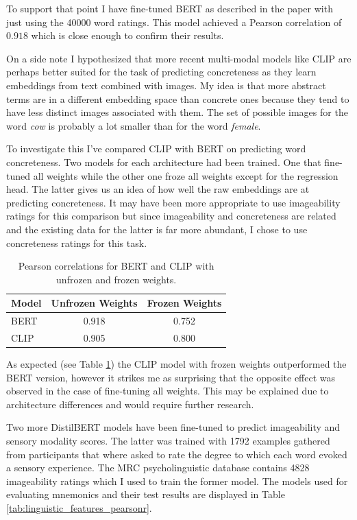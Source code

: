 To support that point I have fine-tuned BERT as described in the paper with just using the 40000 word ratings. This model achieved a Pearson correlation of $0.918$ which is close enough to confirm their results.

On a side note I hypothesized that more recent multi-modal models like CLIP are perhaps better suited for the task of predicting concreteness as they learn embeddings from text combined with images. My idea is that more abstract terms are in a different embedding space than concrete ones because they tend to have less distinct images associated with them. The set of possible images for the word \emph{cow} is probably a lot smaller than for the word \emph{female}.

To investigate this I've compared CLIP with BERT on predicting word concreteness. Two models for each architecture had been trained. One that fine-tuned all weights while the other one froze all weights except for the regression head. The latter gives us an idea of how well the raw embeddings are at predicting concreteness. It may have been more appropriate to use imageability ratings for this comparison but since imageability and concreteness are related and the existing data for the latter is far more abundant, I chose to use concreteness ratings for this task. 

\begin{table}[ht]
\centering
\begin{tabular}{@{}lcc@{}}
\toprule
Model & Unfrozen Weights & Frozen Weights \\ \midrule
BERT           & 0.918                     & 0.752                   \\
CLIP           & 0.905                     & 0.800                   \\ \bottomrule
\end{tabular}
\caption{Pearson correlations for BERT and CLIP with unfrozen and frozen weights.}
\label{tab:clip_bert_comparison}
\end{table}
As expected (see Table \ref{tab:clip_bert_comparison}) the CLIP model with frozen weights outperformed the BERT version, however it strikes me as surprising that the opposite effect was observed in the case of fine-tuning all weights. This may be explained due to architecture differences and would require further research.

Two more DistilBERT models have been fine-tuned to predict imageability and sensory modality scores. The latter was trained with 1792 examples \cite{Juhasz2013} gathered from participants that where asked to rate the degree to which each word evoked a sensory experience. The MRC psycholinguistic database \cite{mrc} contains 4828 imageability ratings which I used to train the former model. The models used for evaluating mnemonics and their test results are displayed in Table \ref{tab:linguistic_features_pearsonr}.

